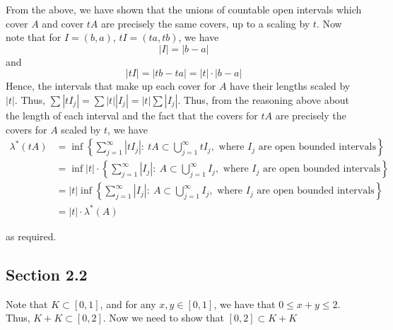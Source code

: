 \documentclass[12pt]{article}
\newenvironment{problem}[2][Problem]{\begin{trivlist}
\item[\hskip \labelsep {\bfseries #1}\hskip \labelsep {\bfseries #2.}]}{\end{trivlist}}
\begin{document}
From the above, we have shown that the unions of countable open intervals which cover $A$ and cover $tA$ are precisely the same covers, up to a scaling by $t$. Now note that for $I = (b, a)$, $tI = (ta, tb)$, we have $$|I| = |b - a|$$ and $$|tI| = |tb - ta| = |t| \cdot |b-a|$$ Hence, the intervals that make up each cover for $A$ have their lengths scaled by $|t|$. Thus, $\sum |tI_j| = \sum |t| |I_j| = |t| \sum |I_j|$. Thus, from the reasoning above about the length of each interval and the fact that the covers for $tA$ are precisely the covers for $A$ scaled by $t$, we have
\begin{align*}
\lambda^*(tA) &= \inf \left\{\sum_{j=1}^{\infty} |tI_j|: \ tA \subset \bigcup_{j=1}^{\infty} tI_j, \text{ where } I_j \text{ are open bounded intervals}\right\}\\
&= \inf |t| \cdot \left\{\sum_{j=1}^{\infty} |I_j|: \ A \subset \bigcup_{j=1}^{\infty} I_j, \text{ where } I_j \text{ are open bounded intervals}\right\}\\
&= |t| \inf \left\{\sum_{j=1}^{\infty} |I_j|: \ A \subset \bigcup_{j=1}^{\infty} I_j, \text{ where } I_j \text{ are open bounded intervals}\right\}\\
&= |t| \cdot \lambda^*(A)
\end{align*}

as required.

\subsection{Section 2.2}

\begin{problem}{5}
\end{problem}

\begin{problem}{6}
\end{problem}

Note that $K \subset [0, 1]$, and for any $x, y \in [0, 1]$, we have that $0 \leq x + y \leq 2$. Thus, $K + K \subset [0, 2]$. Now we need to show that $[0, 2] \subset K + K$
\end{document}
